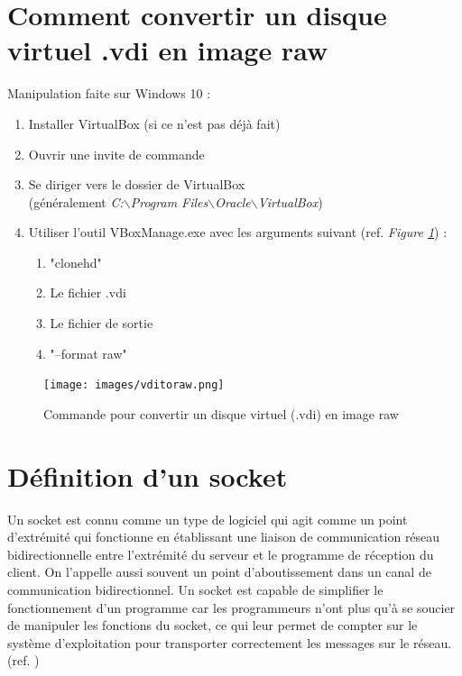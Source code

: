 \documentclass[a4paper]{article}
\begin{document}
\section{Comment convertir un disque virtuel .vdi en image raw}\label{sec:ConvertToRaw}
Manipulation faite sur Windows 10 \cite{6}:
\begin{enumerate}
    \item Installer VirtualBox (si ce n'est pas déjà fait)
    \item Ouvrir une invite de commande
    \item Se diriger vers le dossier de VirtualBox \\
    (généralement \emph{C{}:$\backslash$Program Files$\backslash$Oracle$\backslash$VirtualBox})
    
    \item Utiliser l'outil VBoxManage.exe avec les arguments suivant (ref. \emph{Figure \ref{fig:vditoraw}}) :
    \begin{enumerate}
        \item "clonehd"
        \item Le fichier .vdi
        \item Le fichier de sortie
        \item "--format raw"
    \end{enumerate}
\end{enumerate}
\begin{figure}[H]
    \centering
    \texttt{[image: images/vditoraw.png]}
    \caption{Commande pour convertir un disque virtuel (.vdi) en image raw}
    \label{fig:vditoraw}
\end{figure}









\section{Définition d'un socket} \label{sec:def_socket}
Un socket est connu comme un type de logiciel qui agit comme un point d'extrémité qui fonctionne en établissant une liaison de communication réseau bidirectionnelle entre l'extrémité du serveur et le programme de réception du client. On l'appelle aussi souvent un point d'aboutissement dans un canal de communication bidirectionnel. Un socket est capable de simplifier le fonctionnement d'un programme car les programmeurs n'ont plus qu'à se soucier de manipuler les fonctions du socket, ce qui leur permet de compter sur le système d'exploitation pour transporter correctement les messages sur le réseau. (ref. \cite{7})
\end{document}

